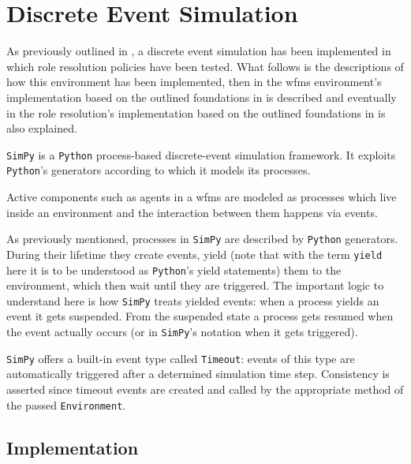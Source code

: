 \chapter{Discrete Event Simulation}
\label{ch:discrete_event_sim}

As previously outlined in , a discrete event simulation has been implemented in which role resolution policies have been tested. What follows is the descriptions of how this environment has been implemented, then in  the \gls{wfms} environment's implementation based on the outlined foundations in  is described and eventually in  the role resolution's implementation based on the outlined foundations in  is also explained.

\texttt{SimPy} is a \texttt{Python} process-based discrete-event simulation framework. It exploits \texttt{Python}'s generators according to which it models its processes.

Active components such as agents in a \gls{wfms} are modeled as processes which live inside an environment and the interaction between them happens via events.

As previously mentioned, processes in \texttt{SimPy} are described by \texttt{Python} generators. During their lifetime they create events, yield (note that with the term \texttt{yield} here it is to be understood as \texttt{Python}'s yield statements) them to the environment, which then wait until they are triggered. The important logic to understand here is how \texttt{SimPy} treats yielded events: when a process yields an event it gets suspended. From the suspended state a process gets resumed when the event actually occurs (or in \texttt{SimPy}'s notation when it gets triggered).

\texttt{SimPy} offers a built-in event type called \texttt{Timeout}: events of this type are automatically triggered after a determined simulation time step. Consistency is asserted since timeout events are created and called by the appropriate method of the passed \texttt{Environment}.

\section{ Implementation}
\label{sec:wfms_implementation}


